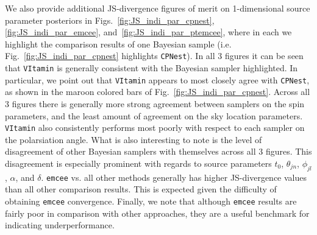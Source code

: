 %
%
We also provide additional \ac{JS}-divergence figures of merit on 
1-dimensional source parameter posteriors in
Figs.~\ref{fig:JS_indi_par_cpnest}, \ref{fig:JS_indi_par_emcee},
and~\ref{fig:JS_indi_par_ptemcee}, where in each we highlight the comparison 
results of one Bayesian sample (i.e. Fig.~\ref{fig:JS_indi_par_cpnest} 
highlights \texttt{CPNest}). In all 3 figures it can be seen that 
\texttt{VItamin} is generally consistent with the Bayesian sampler 
highlighted. In particular, we point out that \texttt{VItamin} 
appears to most closely agree with \texttt{CPNest}, as shown in 
the maroon colored bars of Fig.~\ref{fig:JS_indi_par_cpnest}. Across all 
3 figures there is generally more strong agreement between samplers 
on the spin parameters, and the least amount of agreement on the sky location 
parameters. \texttt{VItamin} also consistently performs most poorly 
with respect to each sampler on the polarsiation angle. What is also 
interesting to note is the level of disagreement of other Bayesian samplers 
with themselves across all 3 figures. This disagreement is especially 
prominent with regards 
to source parameters $t_0$, $\theta_{jn}$, $\phi_{jl}$, $\alpha$, and $\delta$.
\texttt{emcee} vs. all other methods generally has higher \ac{JS}-divergence 
values than all other comparison results. This is expected given the difficulty 
of obtaining \texttt{emcee} convergence.
Finally, we note that although \texttt{emcee} results are 
fairly poor in comparison with other 
approaches, they are a useful benchmark for indicating underperformance.

